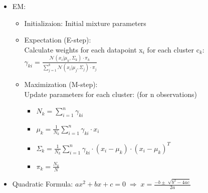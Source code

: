 \documentclass[twocolumn, 10pt]{article}
\begin{document}
\begin{itemize}[leftmargin=*, itemsep=0pt]
    \newpage
    \item EM:
    \begin{itemize}[topsep=0pt]
        \item Initializaion: Initial mixture parameters
        \item Expectation (E-step): \\[2pt]
        Calculate weights for each datapoint x$_i$ for each cluster c$_k$: 
        $\displaystyle \gamma_{ki}=\frac{\mathcal{N}(x_i|\mu_k,\Sigma_k)\cdot\pi_k}{\sum_{j = 1}^{k}\mathcal{N}(x_{i}|\mu_{j},\Sigma_{j})\cdot\pi_{j}}$
        \item Maximization (M-step): \\[2pt]
        Update parameters for each cluster: (for n observations)
        \begin{itemize}
            \item $\displaystyle N_{k}={\sum_{i=1}^{n}\gamma_{ki}}$
            \item $\displaystyle \mu_{k}={\frac{1}{N_{k}}\sum_{i=1}^{n}\gamma_{ki}\cdot x_{i}}$
            \item $\displaystyle \Sigma_{k} = \frac{1}{N_{k}}\sum_{i=1}^{n}\gamma_{ki} \cdot (x_{i} - \mu_{k}) \cdot (x_{i} - \mu_{k})^T$
            \item $\displaystyle \pi_{k}={\frac{N_{k}}{N}}$
        \end{itemize}
    \end{itemize}

    \item Quadratic Formula:
    $\displaystyle ax^2+bx+c=0 \;\Rightarrow\; x=\frac{-b\pm\sqrt[]{b^2-4ac}}{2a}$


\end{itemize}
\end{document}
